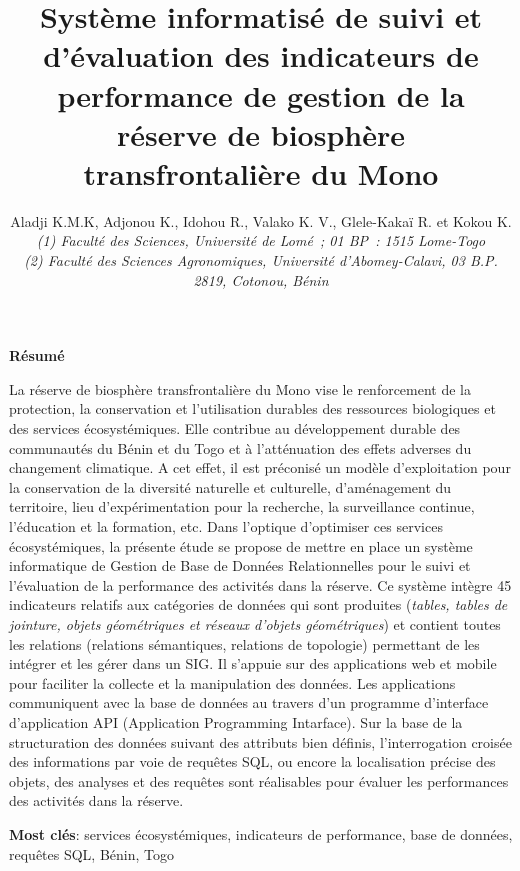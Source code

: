\documentclass[../osfaco.tex]{subfiles}
\title{\large Système informatisé de suivi et d’évaluation des indicateurs de performance de gestion de la réserve de biosphère transfrontalière du Mono}
\author{
	\small Aladji K.M.K\up{1}, Adjonou K\up{1}., Idohou R.\up{2}, Valako K. V.\up{2}, Glele-Kakaï R.\up{2} et Kokou K.\up{1}\\%
	\tiny\textit{(1) Faculté des Sciences, Université de Lomé ; 01 BP : 1515 Lome-Togo}\\
	\tiny\textit{(2) Faculté des Sciences Agronomiques, Université d’Abomey-Calavi, 03 B.P. 2819, Cotonou, Bénin}
}\date{}
\begin{document}
	\maketitle
	\textbf{Résumé}
	
	La réserve de biosphère transfrontalière du Mono vise le renforcement de la protection, la conservation et l’utilisation durables des ressources biologiques et des services écosystémiques. Elle contribue au développement durable des communautés du Bénin et du Togo et à l’atténuation des effets adverses du changement climatique. A cet effet, il est préconisé un modèle d’exploitation pour la conservation de la diversité naturelle et culturelle, d’aménagement du territoire, lieu d’expérimentation pour la recherche, la surveillance continue, l’éducation et la formation, etc. Dans l’optique d’optimiser ces services écosystémiques, la présente étude se propose de mettre en place un système informatique de Gestion de Base de Données Relationnelles pour le suivi et l’évaluation de la performance des activités dans la réserve. Ce système intègre 45 indicateurs relatifs aux catégories de données qui sont produites (\textit{tables, tables de jointure, objets géométriques et réseaux d'objets géométriques}) et contient toutes les relations (relations sémantiques, relations de topologie) permettant de les intégrer et les gérer dans un SIG. Il s’appuie sur des applications web et mobile pour faciliter la collecte et la manipulation des données. Les applications communiquent avec la base de données au travers d’un programme d’interface d’application API (Application Programming Intarface). Sur la base de la structuration des données suivant des attributs bien définis, l'interrogation croisée des informations par voie de requêtes SQL, ou encore la localisation précise des objets, des analyses et des requêtes sont réalisables pour évaluer les performances des activités dans la réserve.
	
	\textbf{Most clés}: services écosystémiques, indicateurs de performance, base de données, requêtes SQL, Bénin, Togo
\end{document}

